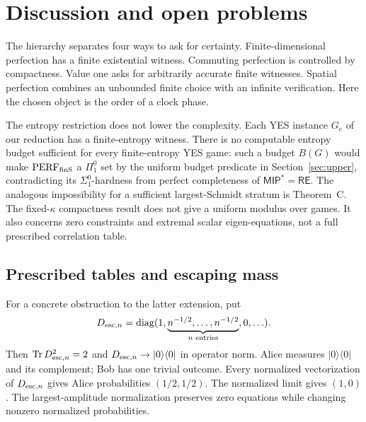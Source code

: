 \section{Discussion and open problems}\label{sec:discussion}
The hierarchy separates four ways to ask for certainty. Finite-dimensional perfection has a finite existential witness. Commuting perfection is controlled by compactness. Value one asks for arbitrarily accurate finite witnesses. Spatial perfection combines an unbounded finite choice with an infinite verification. Here the chosen object is the order of a clock phase.

The entropy restriction does not lower the complexity. Each YES instance $G_e$ of our reduction has a finite-entropy witness. There is no computable entropy budget sufficient for every finite-entropy YES game: such a budget $B(G)$ would make $\mathrm{PERF}_{\mathrm{finS}}$ a $\Pi^0_1$ set by the uniform budget predicate in Section~\ref{sec:upper}, contradicting its $\Sigma^0_1$-hardness from perfect completeness of $\mathsf{MIP}^*=\mathsf{RE}$. The analogous impossibility for a sufficient largest-Schmidt stratum is Theorem~C. The fixed-$\kappa$ compactness result does not give a uniform modulus over games. It also concerns zero constraints and extremal scalar eigen-equations, not a full prescribed correlation table.

\subsection{Prescribed tables and escaping mass}
For a concrete obstruction to the latter extension, put
\[
 D_{{\rm esc},n}=\operatorname{diag}(1,\underbrace{n^{-1/2},\ldots,n^{-1/2}}_{n\text{ entries}},0,\ldots).
\]
Then $\operatorname{Tr} D_{{\rm esc},n}^2=2$ and $D_{{\rm esc},n}\to|0\rangle\langle0|$ in operator norm. Alice measures $|0\rangle\langle0|$ and its complement; Bob has one trivial outcome. Every normalized vectorization of $D_{{\rm esc},n}$ gives Alice probabilities $(1/2,1/2)$. The normalized limit gives $(1,0)$. The largest-amplitude normalization preserves zero equations while changing nonzero normalized probabilities.

